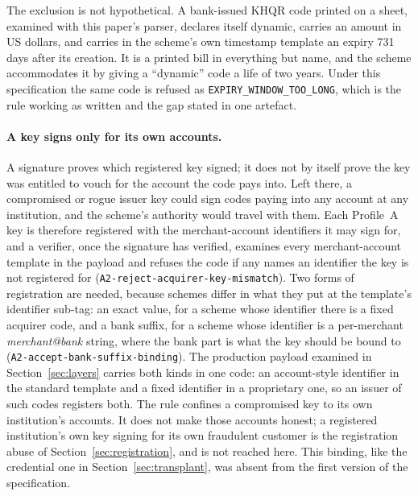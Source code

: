 \documentclass[10pt,a4paper,twocolumn]{article}
\newcommand{\code}[1]{\texttt{\small #1}}
\begin{document}
The exclusion is not hypothetical. A bank-issued KHQR code printed on a
sheet, examined with this paper's parser, declares itself dynamic, carries an
amount in US dollars, and carries in the scheme's own timestamp template an
expiry 731 days after its creation. It is a printed bill in everything but
name, and the scheme accommodates it by giving a ``dynamic'' code a life of
two years. Under this specification the same code is refused as
\code{EXPIRY\_WINDOW\_TOO\_LONG}, which is the rule working as written and the
gap stated in one artefact.

\paragraph{A key signs only for its own accounts.} A signature proves which
registered key signed; it does not by itself prove the key was entitled to
vouch for the account the code pays into. Left there, a compromised or rogue
issuer key could sign codes paying into any account at any institution, and
the scheme's authority would travel with them. Each Profile~A key is
therefore registered with the merchant-account identifiers it may sign for,
and a verifier, once the signature has verified, examines every
merchant-account template in the payload and refuses the code if any names
an identifier the key is not registered for
(\code{A2-reject-\allowbreak acquirer-\allowbreak key-\allowbreak mismatch}).
Two forms of registration are needed, because schemes differ in what they put
at the template's identifier sub-tag: an exact value, for a scheme whose
identifier there is a fixed acquirer code, and a bank suffix, for a scheme
whose identifier is a per-merchant \emph{merchant@bank} string, where the
bank part is what the key should be bound to
(\code{A2-accept-\allowbreak bank-\allowbreak suffix-\allowbreak binding}).
The production payload examined in Section~\ref{sec:layers} carries both
kinds in one code: an account-style identifier in the standard template and
a fixed identifier in a proprietary one, so an issuer of such codes registers
both. The rule confines a compromised key to its own institution's accounts.
It does not make those accounts honest; a registered institution's own key
signing for its own fraudulent customer is the registration abuse of
Section~\ref{sec:registration}, and is not reached here. This binding, like
the credential one in Section~\ref{sec:transplant}, was absent from the
first version of the specification.
\end{document}
